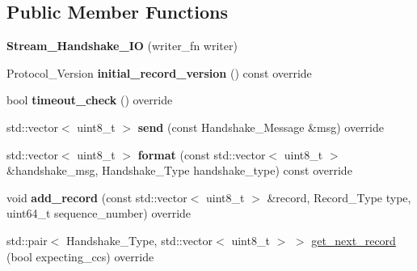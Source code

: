 \subsection*{Public Member Functions}
\begin{DoxyCompactItemize}
\item 
\mbox{\label{class_botan_1_1_t_l_s_1_1_stream___handshake___i_o_a6514ed9b034d4b0669d68b764ae4c39d}} 
{\bfseries Stream\+\_\+\+Handshake\+\_\+\+IO} (writer\+\_\+fn writer)
\item 
\mbox{\label{class_botan_1_1_t_l_s_1_1_stream___handshake___i_o_a8363e1f9ebcaf9fef505d39727fce09f}} 
Protocol\+\_\+\+Version {\bfseries initial\+\_\+record\+\_\+version} () const override
\item 
\mbox{\label{class_botan_1_1_t_l_s_1_1_stream___handshake___i_o_aa921d47f53cae74eddfba49378f0a632}} 
bool {\bfseries timeout\+\_\+check} () override
\item 
\mbox{\label{class_botan_1_1_t_l_s_1_1_stream___handshake___i_o_abaf808f1dc8c57ea3e4e1414e6edd1c2}} 
std\+::vector$<$ uint8\+\_\+t $>$ {\bfseries send} (const Handshake\+\_\+\+Message \&msg) override
\item 
\mbox{\label{class_botan_1_1_t_l_s_1_1_stream___handshake___i_o_a803ca99e3dd134d342a1e702a867a82c}} 
std\+::vector$<$ uint8\+\_\+t $>$ {\bfseries format} (const std\+::vector$<$ uint8\+\_\+t $>$ \&handshake\+\_\+msg, Handshake\+\_\+\+Type handshake\+\_\+type) const override
\item 
\mbox{\label{class_botan_1_1_t_l_s_1_1_stream___handshake___i_o_a9fbe1303d5694b2f9bd3c3de3f0eedf7}} 
void {\bfseries add\+\_\+record} (const std\+::vector$<$ uint8\+\_\+t $>$ \&record, Record\+\_\+\+Type type, uint64\+\_\+t sequence\+\_\+number) override
\item 
std\+::pair$<$ Handshake\+\_\+\+Type, std\+::vector$<$ uint8\+\_\+t $>$ $>$ \mbox{\hyperlink{class_botan_1_1_t_l_s_1_1_stream___handshake___i_o_aa198869863aa2d98b8a6c89e01e73d4d}{get\+\_\+next\+\_\+record}} (bool expecting\+\_\+ccs) override
\end{DoxyCompactItemize}


